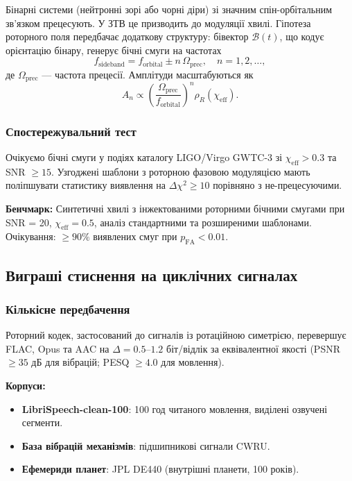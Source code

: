\documentclass[11pt,a4paper]{article}
\newcommand{\Biv}{\mathcal{B}}
\theoremstyle{definition}
\theoremstyle{plain}
\theoremstyle{remark}
\begin{document}
Бінарні системи (нейтронні зорі або чорні діри) зі значним спін-орбітальним зв’язком прецесують. У ЗТВ це призводить до модуляції хвилі. Гіпотеза роторного поля передбачає додаткову структуру: бівектор $\Biv(t)$, що кодує орієнтацію бінару, генерує бічні смуги на частотах
\begin{equation}
f_{\text{sideband}} = f_{\text{orbital}} \pm n\,\Omega_{\text{prec}}, \quad n=1,2,\ldots,
\end{equation}
де $\Omega_{\text{prec}}$ — частота прецесії. Амплітуди масштабуються як
\begin{equation}
A_n \propto \left(\frac{\Omega_{\text{prec}}}{f_{\text{orbital}}}\right)^n \rho_R(\chi_{\text{eff}}).
\end{equation}

\subsubsection{Спостережувальний тест}

Очікуємо бічні смуги у подіях каталогу LIGO/Virgo GWTC-3 зі $\chi_{\text{eff}} > 0.3$ та SNR $\ge 15$. Узгоджені шаблони з роторною фазовою модуляцією мають поліпшувати статистику виявлення на $\Delta\chi^2 \ge 10$ порівняно з не-прецесуючими.

\textbf{Бенчмарк:} Синтетичні хвилі з інжектованими роторними бічними смугами при SNR = 20, $\chi_{\text{eff}} = 0.5$, аналіз стандартними та розширеними шаблонами. Очікування: $\ge 90\%$ виявлених смуг при $p_{\text{FA}} < 0.01$.

\subsection{Виграші стиснення на циклічних сигналах}

\subsubsection{Кількісне передбачення}

Роторний кодек, застосований до сигналів із ротаційною симетрією, перевершує FLAC, Opus та AAC на $\Delta = 0.5$–$1.2$ біт/відлік за еквівалентної якості (PSNR $\ge 35$ дБ для вібрацій; PESQ $\ge 4.0$ для мовлення).

\textbf{Корпуси:}
\begin{itemize}
  \item \textbf{LibriSpeech-clean-100}: 100 год читаного мовлення, виділені озвучені сегменти.
  \item \textbf{База вібрацій механізмів}: підшипникові сигнали CWRU.
  \item \textbf{Ефемериди планет}: JPL DE440 (внутрішні планети, 100 років).
\end{itemize}
\end{document}
